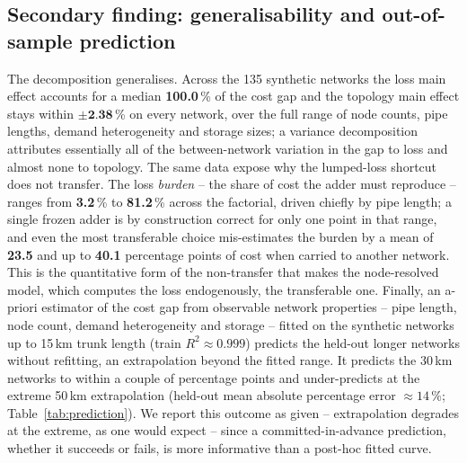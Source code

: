 \documentclass[a4paper,fleqn]{cas-dc}
\begin{document}
\subsection{Secondary finding: generalisability and out-of-sample prediction}
\label{subsec:generalis}
The decomposition generalises. Across the 135 synthetic networks the loss main effect
accounts for a median \textbf{100.0}\,\% of the cost gap and the topology main
effect stays within $\pm\textbf{2.38}$\,\% on every network, over the full range of
node counts, pipe lengths, demand heterogeneity and storage sizes; a variance decomposition
attributes essentially all of the between-network variation in the gap to loss and almost none
to topology. The same data expose why the lumped-loss shortcut does not transfer. The loss
\emph{burden} -- the share of cost the adder must reproduce -- ranges from
\textbf{3.2}\,\% to \textbf{81.2}\,\% across the factorial, driven
chiefly by pipe length; a single frozen adder is by construction correct for only one point in
that range, and even the most transferable choice mis-estimates the burden by a mean of
\textbf{23.5} and up to \textbf{40.1} percentage points of cost
when carried to another network. This is the quantitative form of the non-transfer that makes
the node-resolved model, which computes the loss endogenously, the transferable one. Finally,
an a-priori estimator of the cost gap from observable network properties -- pipe length, node
count, demand heterogeneity and storage -- fitted on the synthetic networks up to 15\,km trunk
length (train $R^2\approx0.999$) predicts the held-out longer networks without refitting, an
extrapolation beyond the fitted range. It predicts the 30\,km networks to within a couple of
percentage points and under-predicts at the extreme 50\,km extrapolation (held-out mean absolute
percentage error $\approx14$\,\%; Table~\ref{tab:prediction}). We report this outcome as given --
extrapolation degrades at the extreme, as one would expect -- since a committed-in-advance
prediction, whether it succeeds or fails, is more informative than a post-hoc fitted curve.
\end{document}
